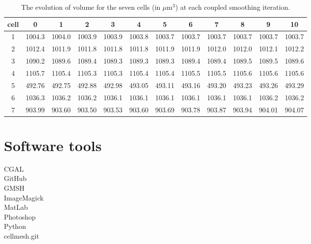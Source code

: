 \documentclass[a4paper,10pt]{article}
\begin{document}
\begin{table}[H]
\begin{center}
\footnotesize
\begin{tabular}{|c|ccccccccccc|}
\hline
cell & 0 &1 &2 &3 &4 &5 &6 &7 &8 &9 &10\\
\hline
1 &1004.3 &1004.0 &1003.9 &1003.9 &1003.8 &1003.7 &1003.7 &1003.7 &1003.7 &1003.7 &1003.7\\
2 &1012.4 &1011.9 &1011.8 &1011.8 &1011.8 &1011.9 &1011.9 &1012.0 &1012.0 &1012.1 &1012.2\\
3 &1090.2 &1089.6 &1089.4 &1089.3 &1089.3 &1089.3 &1089.4 &1089.4 &1089.5 &1089.5 &1089.6\\
4 &1105.7 &1105.4 &1105.3 &1105.3 &1105.4 &1105.4 &1105.5 &1105.5 &1105.6 &1105.6 &1105.6\\
5 &492.76 &492.75 &492.88 &492.98 &493.05 &493.11 &493.16 &493.20 &493.23 &493.26 &493.29\\
6 &1036.3 &1036.2 &1036.2 &1036.1 &1036.1 &1036.1 &1036.1 &1036.1 &1036.1 &1036.2 &1036.2\\
7 &903.99 &903.60 &903.50 &903.53 &903.60 &903.69 &903.78 &903.87 &903.94 &904.01 &904.07\\
\hline
\end{tabular}
\end{center}
\caption{The evolution of volume for the seven cells (in $\mu \text{m}^3$)  at each coupled smoothing iteration.}
\label{tab:vol}
\end{table}

\section{Software tools}
CGAL \\
GitHub \\
GMSH \\
ImageMagick \\
MatLab \\
Photoshop \\
Python \\

cellmesh.git\\
\end{document}
